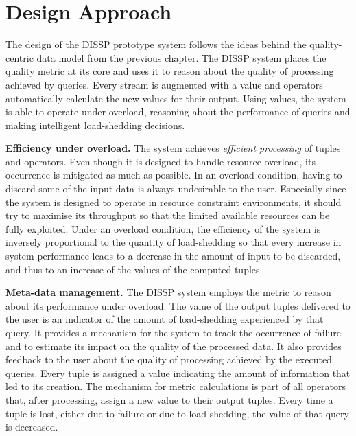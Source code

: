 \section{Design Approach} 
\label{sec:design}


The design of the DISSP prototype system follows the ideas behind the quality-centric data model
from the previous chapter. 
The DISSP system places the \sic quality metric at its core and uses it to reason about the
quality of processing achieved by queries. 
Every stream is augmented with a \sic value and operators automatically calculate the
new values for their output.
Using \sic values, the system is able to operate under overload, reasoning about the performance of
queries and making intelligent \mbox{load-shedding} decisions.

\textbf{Efficiency under overload.} 
The system achieves \emph{efficient processing} of tuples and operators. Even though it
is designed to handle resource overload, its occurrence is mitigated as much as possible. 
In an overload condition, having to discard some of the input data is always
undesirable to the user. Especially since the system is designed to operate in resource constraint 
environments, it should try to maximise its throughput so that the limited available resources
can be fully exploited. 
Under an overload condition, the efficiency of the system is inversely proportional to the quantity of
load-shedding so that every increase in system performance leads to a decrease in the
amount of input to be discarded, and thus to an increase of the \sic values of the computed tuples.

\textbf{Meta-data management.}
The DISSP system employs the \sic metric to reason about its performance under overload. The \sic value
of the output tuples delivered to the user is an indicator of the amount of load-shedding
experienced by that query. It provides a mechanism for the system to track the occurrence of failure and
to estimate its impact on the quality of the processed data. It also provides feedback to the user about the
quality of processing achieved by the executed queries.
Every tuple is assigned a \sic value indicating the amount of information that led to its creation.
The mechanism for \sic metric calculations is part of all operators that, after processing, assign a
new \sic value to their output tuples. 
Every time a tuple is lost, either due to failure or due to load-shedding, the \sic value of that query
is decreased.

